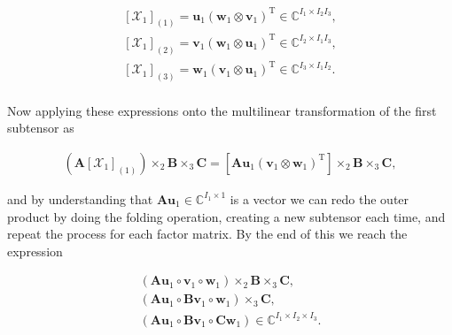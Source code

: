\documentclass[a4paper,10pt]{article}
\begin{document}
\begin{enumerate}
\begin{enumerate}
                \begin{align}
                    \left[\mathcal{X}_{1}\right]_{(1)} = \boldsymbol{u}_{1} (\boldsymbol{w}_{1} \otimes \boldsymbol{v}_{1})^{\text{T}} \in \mathbb{C}^{I_{1} \times I_{2} I_{3}}, \\
                    \left[\mathcal{X}_{1}\right]_{(2)} = \boldsymbol{v}_{1} (\boldsymbol{w}_{1} \otimes \boldsymbol{u}_{1})^{\text{T}} \in \mathbb{C}^{I_{2} \times I_{1} I_{3}}, \\
                    \left[\mathcal{X}_{1}\right]_{(3)} = \boldsymbol{w}_{1} (\boldsymbol{v}_{1} \otimes \boldsymbol{u}_{1})^{\text{T}} \in \mathbb{C}^{I_{3} \times I_{1} I_{2}}.
                \end{align}
                
                \paragraph{}Now applying these expressions onto the multilinear transformation of the first subtensor as
                
                \begin{align}
                    \left( \boldsymbol{A} \left[\mathcal{X}_{1}\right]_{(1)} \right) \times_{2} \boldsymbol{B} \times_{3} \boldsymbol{C} = \left[ \boldsymbol{A}\boldsymbol{u}_{1} (\boldsymbol{v}_{1} \otimes \boldsymbol{w}_{1})^{\text{T}}  \right] \times_{2} \boldsymbol{B} \times_{3} \boldsymbol{C},
                \end{align}
                
                and by understanding that $\boldsymbol{A}\boldsymbol{u}_{1} \in \mathbb{C}^{I_{1} \times 1}$ is a vector we can redo the outer product by doing the folding operation, creating a new subtensor each time, and repeat the process for each factor matrix. By the end of this we reach the expression 
                
                \begin{align}
                    \left( \boldsymbol{A} \boldsymbol{u}_{1} \circ \boldsymbol{v}_{1} \circ \boldsymbol{w}_{1} \right) \times_{2} \boldsymbol{B} \times_{3} \boldsymbol{C}, \\
                    \left( \boldsymbol{A} \boldsymbol{u}_{1} \circ \boldsymbol{B} \boldsymbol{v}_{1} \circ \boldsymbol{w}_{1} \right) \times_{3} \boldsymbol{C}, \\
                    \left( \boldsymbol{A} \boldsymbol{u}_{1} \circ \boldsymbol{B} \boldsymbol{v}_{1} \circ \boldsymbol{C} \boldsymbol{w}_{1} \right) \in \mathbb{C}^{I_{1} \times I_{2} \times I_{3}}.
                \end{align}
                

\end{enumerate}
\end{enumerate}
\end{document}
